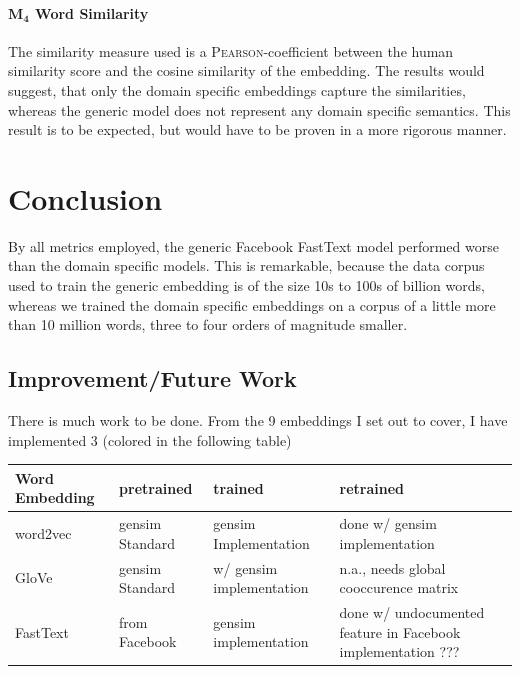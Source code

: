 \documentclass[10pt,a4paper]{article}
\begin{document}
\paragraph{$\boldsymbol{M_4}$ Word Similarity} The similarity measure used is a \textsc{Pearson}-coefficient between the human similarity score and the cosine similarity of the embedding. 
The results would suggest, that only the domain specific embeddings capture the similarities, whereas the generic model does not represent any domain specific semantics. This result is to be expected, but would have to be proven in a more rigorous manner.  




\section{Conclusion}
	
By all metrics employed, the generic Facebook FastText model performed worse than the domain specific models. This is remarkable, because the data corpus used to train the generic embedding	is of the size 10s to 100s of billion words, whereas we trained the domain specific embeddings on a corpus of a little more than 10 million words, three to four orders of magnitude smaller.
	
	\subsection{Improvement/Future Work}
	There is much work to be done. From the 9 embeddings I set out to cover, I have implemented 3 (colored in the following table)

	\begin{center}
		\begin{tabular}{|l|p{3cm}| p{3cm}| p{3cm}|}
			\hline
			\textbf{Word Embedding} & pretrained & trained & retrained \\ 
			\hline
			word2vec  & gensim Standard & \cellcolor{blue!25} gensim Implementation & done w/ gensim implementation \\  
			\hline
			GloVe & gensim Standard &w/ gensim implementation & n.a., needs global cooccurence matrix \\  
			\hline
			FastText & \cellcolor{blue!25 }from Facebook  &\cellcolor{blue!25 } gensim implementation & done w/ undocumented feature in Facebook implementation ???\\
			\hline
      \end{tabular}	
\end{center}
\end{document}
